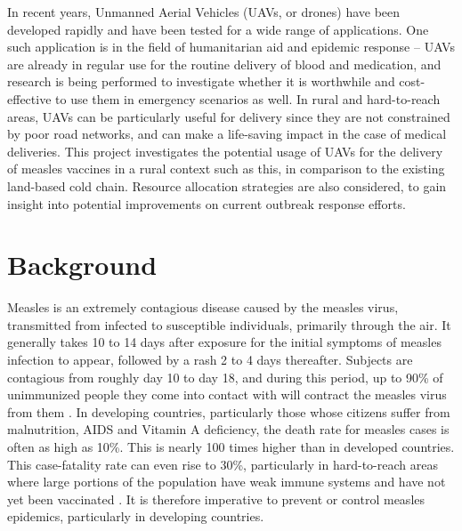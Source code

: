 In recent years, Unmanned Aerial Vehicles (UAVs, or drones) have been developed rapidly and have been tested for a wide range of applications. One such application is in the field of humanitarian aid and epidemic response -- UAVs are already in regular use for the routine delivery of blood and medication, and research is being performed to investigate whether it is worthwhile and cost-effective to use them in emergency scenarios as well. In rural and hard-to-reach areas, UAVs can be particularly useful for delivery since they are not constrained by poor road networks, and can make a life-saving impact in the case of medical deliveries. This project investigates the potential usage of UAVs for the delivery of measles vaccines in a rural context such as this, in comparison to the existing land-based cold chain. Resource allocation strategies are also considered, to gain insight into potential improvements on current outbreak response efforts.

\section{Background}
\label{measles-background}
Measles is an extremely contagious disease caused by the measles virus, transmitted from infected to susceptible individuals, primarily through the air. It generally takes 10 to 14 days after exposure for the initial symptoms of measles infection to appear, followed by a rash 2 to 4 days thereafter. Subjects are contagious from roughly day 10 to day 18, and during this period, up to 90\% of unimmunized people they come into contact with will contract the measles virus from them \cite{cdc_2018}. 
In developing countries, particularly those whose citizens suffer from malnutrition, AIDS and Vitamin A deficiency, the death rate for measles cases is often as high as 10\%. This is nearly 100 times higher than in developed countries. This case-fatality rate can even rise to 30\%, particularly in hard-to-reach areas where large portions of the population have weak immune systems and have not yet been vaccinated \citep{world2017measles}. It is therefore imperative to prevent or control measles epidemics, particularly in developing countries.

